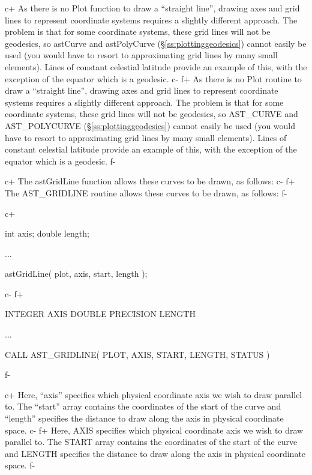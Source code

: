 \documentclass[twoside,11pt]{starlink}
\providecommand{\secref}[1]{\S\ref{#1}}
\begin{document}
c+
As there is no Plot function to draw a ``straight line'', drawing axes
and grid lines to represent coordinate systems requires a slightly
different approach. The problem is that for some coordinate systems,
these grid lines will not be geodesics, so astCurve and astPolyCurve
(\secref{ss:plottinggeodesics}) cannot easily be used (you would have
to resort to approximating grid lines by many small elements). Lines
of constant celestial latitude provide an example of this, with the
exception of the equator which is a geodesic.
c-
f+
As there is no Plot routine to draw a ``straight line'', drawing axes
and grid lines to represent coordinate systems requires a slightly
different approach. The problem is that for some coordinate systems,
these grid lines will not be geodesics, so AST\_CURVE and
AST\_POLYCURVE (\secref{ss:plottinggeodesics}) cannot easily be used
(you would have to resort to approximating grid lines by many small
elements). Lines of constant celestial latitude provide an example of
this, with the exception of the equator which is a geodesic.
f-

c+
The astGridLine function allows these curves to be drawn, as follows:
c-
f+
The AST\_GRIDLINE routine allows these curves to be drawn, as follows:
f-

c+
\small
\begin{terminalv}
int axis;
double length;

...

astGridLine( plot, axis, start, length );
\end{terminalv}
\normalsize
c-
f+
\small
\begin{terminalv}
      INTEGER AXIS
      DOUBLE PRECISION LENGTH

      ...

      CALL AST_GRIDLINE( PLOT, AXIS, START, LENGTH, STATUS )
\end{terminalv}
\normalsize
f-

c+
Here, ``axis'' specifies which physical coordinate axis we wish to
draw parallel to. The ``start'' array contains the coordinates of the
start of the curve and ``length'' specifies the distance to draw along
the axis in physical coordinate space.
c-
f+
Here, AXIS specifies which physical coordinate axis we wish to draw
parallel to. The START array contains the coordinates of the start of
the curve and LENGTH specifies the distance to draw along the axis in
physical coordinate space.
f-
\end{document}
